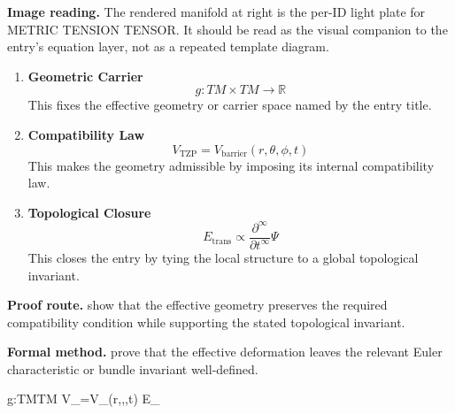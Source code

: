 \begin{samepage}
\noindent\begin{minipage}[t]{0.45\linewidth}
\vspace{0pt}
\raggedright
\scriptsize\textbf{Image reading.} The rendered manifold at right is the per-ID light plate for METRIC TENSION TENSOR. It should be read as the visual companion to the entry's equation layer, not as a repeated template diagram.\par
\end{minipage}\hfill
\begin{minipage}[t]{0.53\linewidth}
\vspace*{-0.10in}
\raggedright
{}
\end{minipage}
\end{samepage}

\clearpage


\begin{enumerate}[leftmargin=1.6em,itemsep=9pt,topsep=6pt]
\item \textbf{Geometric Carrier}
\[
g:TM\times TM\to\mathbb{R}
\]
This fixes the effective geometry or carrier space named by the entry title.

\item \textbf{Compatibility Law}
\[
V_{\mathrm{TZP}}
=
V_{\mathrm{barrier}}(r,\theta,\phi,t)
\]
This makes the geometry admissible by imposing its internal compatibility law.

\item \textbf{Topological Closure}
\[
E_{\mathrm{trans}}
\propto
\frac{\partial^\infty}{\partial t^\infty}\Psi
\]
This closes the entry by tying the local structure to a global topological invariant.
\end{enumerate}

\textbf{Proof route.} show that the effective geometry preserves the required compatibility condition while supporting the stated topological invariant.

\textbf{Formal method.} prove that the effective deformation leaves the relevant Euler characteristic or bundle invariant well-defined.

\medskip
{}

\begin{tzpsnapshot}
\end{tzpsnapshot}

\tzpequationlinks
  {g:TM\times TM\to{}}
  {V_{}=V_{}(r,\theta,\phi,t)}
  {E_{}\propto{}\Psi}
